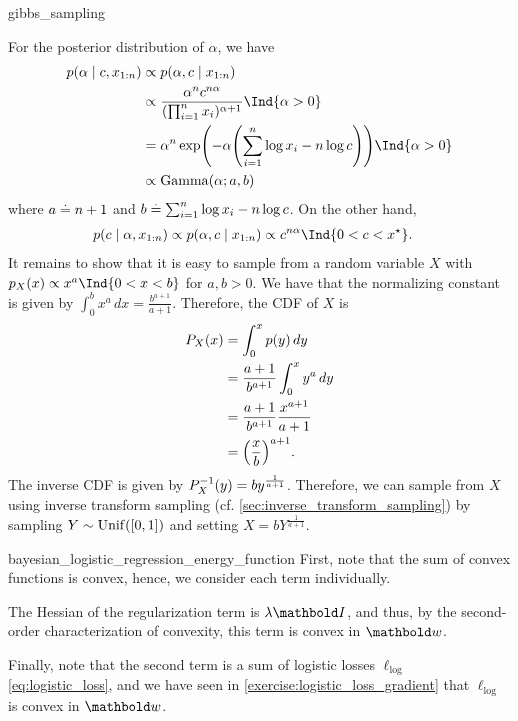 \begin{solution}{gibbs_sampling}
\begin{enumerate}[beginpenalty=10000]
    For the posterior distribution of $\alpha$, we have \begin{align*}
      p(\alpha \mid c, x_{1:n}) &\propto p(\alpha, c \mid x_{1:n}) \\
      &\propto \frac{\alpha^n c^{n \alpha}}{(\prod_{i=1}^n x_i)^{\alpha+1}} \Ind{\alpha > 0} \\
      &= \alpha^n \exp\parentheses*{- \alpha \parentheses*{\sum_{i=1}^n \log x_i - n \log c}} \Ind{\alpha > 0} \\
      &\propto \GammaDistr[\alpha]{a}{b}
    \end{align*} where $a \overset{.}{=} n+1$ and $b \overset{.}{=} \sum_{i=1}^n \log x_i - n \log c$.
    On the other hand, \begin{align*}
      p(c \mid \alpha, x_{1:n}) &\propto p(\alpha, c \mid x_{1:n}) \propto c^{n \alpha} \Ind{0 < c < \opt{x}}.
    \end{align*}
    It remains to show that it is easy to sample from a random variable $X$ with $p_X(x) \propto x^a \Ind{0 < x < b}$ for $a,b > 0$.
    We have that the normalizing constant is given by $\int_0^b x^a \,d x = \frac{b^{a+1}}{a+1}$.
    Therefore, the CDF of $X$ is \begin{align*}
      P_X(x) &= \int_0^x p(y) \,d y \\
      &= \frac{a+1}{b^{a+1}} \int_0^x y^a \,d y \\
      &= \frac{a+1}{b^{a+1}} \frac{x^{a+1}}{a+1} \\
      &= \parentheses*{\frac{x}{b}}^{a+1}.
    \end{align*}
    The inverse CDF is given by $P_X^{-1}(y) = b y^{\frac{1}{a+1}}$.
    Therefore, we can sample from $X$ using inverse transform sampling (cf. \cref{sec:inverse_transform_sampling}) by sampling $Y \sim \Unif{[0,1]}$ and setting $X = b Y^{\frac{1}{a+1}}$.
  \end{enumerate}
\end{solution}

\begin{solution}{bayesian_logistic_regression_energy_function}
  First, note that the sum of convex functions is convex, hence, we consider each term individually.

  The Hessian of the regularization term is $\lambda \mI$, and thus, by the second-order characterization of convexity, this term is convex in $\vw$.

  Finally, note that the second term is a sum of logistic losses $\ell_\mathrm{log}$ \eqref{eq:logistic_loss}, and we have seen in \cref{exercise:logistic_loss_gradient} that $\ell_\mathrm{log}$ is convex in $\vw$.
\end{solution}

